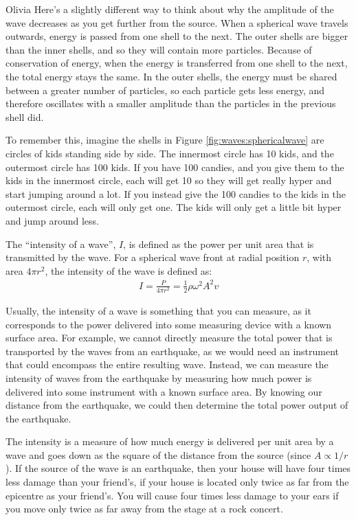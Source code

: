 \begin{studentOpinion}{Olivia}
Here's a slightly different way to think about why the amplitude of the wave decreases as you get further from the source. When a spherical wave travels outwards, energy is passed from one shell to the next. The outer shells are bigger than the inner shells, and so they will contain more particles. Because of conservation of energy, when the energy is transferred from one shell to the next, the total energy stays the same. In the outer shells, the energy must be shared between a greater number of particles, so each particle gets less energy, and therefore oscillates with a smaller amplitude than the particles in the previous shell did.

To remember this, imagine the shells in Figure \ref{fig:waves:sphericalwave} are circles of kids standing side by side. The innermost circle has 10 kids, and the outermost circle has 100 kids. If you have 100 candies, and you give them to the kids in the innermost circle, each will get 10 so they will get really hyper and start jumping around a lot. If you instead give the 100 candies to the kids in the outermost circle, each will only get one. The kids will only get a little bit hyper and jump around less.
\end{studentOpinion}

The ``intensity of a wave'', $I$, is defined as the power per unit area that is transmitted by the wave. For a spherical wave front at radial position $r$, with area $4\pi r^2$, the intensity of the wave is defined as:
\begin{align*}
I = \frac{P}{4\pi r^2} = \frac{1}{2}\rho  \omega^2 A^2 v
\end{align*}

Usually, the intensity of a wave is something that you can measure, as it corresponds to the power delivered into some measuring device with a known surface area. For example, we cannot directly measure the total power that is transported by the waves from an earthquake, as we would need an instrument that could encompass the entire resulting wave. Instead, we can measure the intensity of waves from the earthquake by measuring how much power is delivered into some instrument with a known surface area. By knowing our distance from the earthquake, we could then determine the total power output of the earthquake. 

The intensity is a measure of how much energy is delivered per unit area by a wave and goes down as the square of the distance from the source (since $A\propto 1/r$). If the source of the wave is an earthquake, then your house will have four times less damage than your friend's, if your house is located only twice as far from the epicentre as your friend's. You will cause four times less damage to your ears if you move only twice as far away from the stage at a rock concert.

